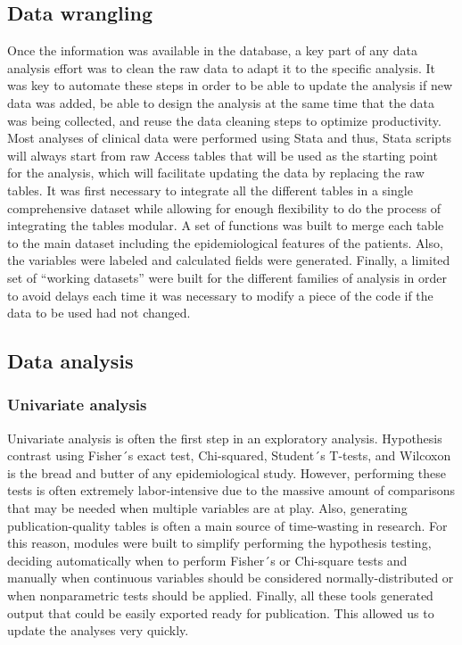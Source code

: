 \subsection{Data wrangling}
Once the information was available in the database, a key part of any data analysis effort was to clean the raw data to adapt it to the specific analysis. It was key to automate these steps in order to be able to update the analysis if new data was added, be able to design the analysis at the same time that the data was being collected, and reuse the data cleaning steps to optimize productivity. Most analyses of clinical data were performed using Stata and thus, Stata scripts will always start from raw Access tables that will be used as the starting point for the analysis, which will facilitate updating the data by replacing the raw tables. It was first necessary to integrate all the different tables in a single comprehensive dataset while allowing for enough flexibility to do the process of integrating the tables modular. A set of functions was built to merge each table to the main dataset including the epidemiological features of the patients. Also, the variables were labeled and calculated fields were generated. Finally, a limited set of “working datasets” were built for the different families of analysis in order to avoid delays each time it was necessary to modify a piece of the code if the data to be used had not changed.

\subsection{Data analysis}
\subsubsection{Univariate analysis}
Univariate analysis is often the first step in an exploratory analysis. Hypothesis contrast using Fisher´s exact test, Chi-squared, Student´s T-tests, and Wilcoxon is the bread and butter of any epidemiological study. However, performing these tests is often extremely labor-intensive due to the massive amount of comparisons that may be needed when multiple variables are at play. Also, generating publication-quality tables is often a main source of time-wasting in research. For this reason, modules were built to simplify performing the hypothesis testing, deciding automatically when to perform Fisher´s or Chi-square tests and manually when continuous variables should be considered normally-distributed or when nonparametric tests should be applied. Finally, all these tools generated output that could be easily exported ready for publication. This allowed us to update the analyses very quickly.

